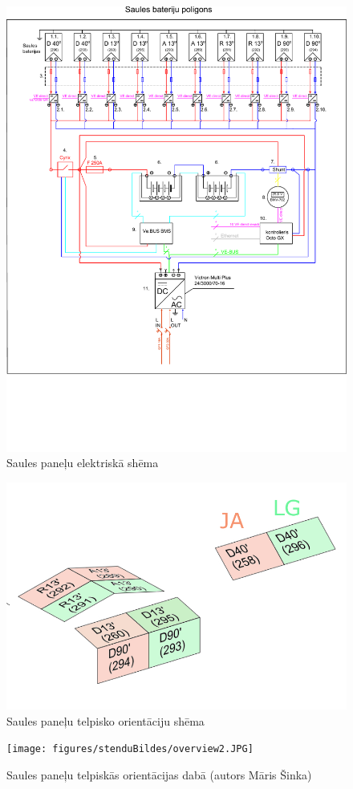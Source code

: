 \begin{figure}[h]
    \centering
    \includegraphics[width=0.7\linewidth]{figures/misc/shema.pdf}
    \caption{Saules paneļu elektriskā shēma}
    \label{fig:paneli666}
\end{figure}

\begin{figure}[h]
    \centering
    \includegraphics[width=0.7\linewidth]{figures/misc/uzstadijumaShema.jpg}
    \caption{Saules paneļu telpisko orientāciju shēma}
    \label{fig:paneli}
\end{figure}

\begin{figure}[h]
    \centering
    \texttt{[image: figures/stenduBildes/overview2.JPG]}
    \caption{Saules paneļu telpiskās orientācijas dabā (autors Māris Šinka)}
    \label{fig:paneli}
\end{figure}

